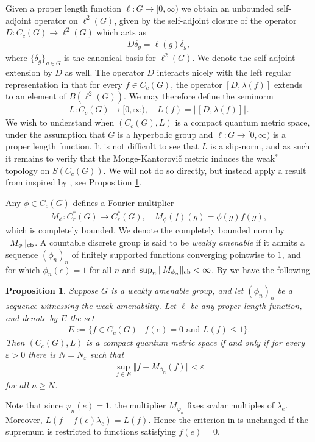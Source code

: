 \documentclass[12pt,a4paper,oneside,final,reqno]{amsart}
\theoremstyle{plain}
\newtheorem{proposition}[theorem]{Proposition}
\theoremstyle{definition}
\begin{document}
Given a proper length function $\ell \colon G \to [0,\infty)$ we obtain an unbounded self-adjoint operator on $\ell^2(G)$, given by the self-adjoint closure of the operator $D \colon C_c(G) \to \ell^2(G)$ which acts as
\begin{align*}
    D \delta_g = \ell(g) \delta_g,
\end{align*}
where $\{\delta_g\}_{g\in G}$ is the canonical basis for $\ell^2(G)$. We denote the self-adjoint extension by $D$ as well. The operator $D$ interacts nicely with the left regular representation in that for every $f \in C_c(G)$, the operator $[D, \lambda(f)]$ extends to an element of $B(\ell^2(G))$. We may therefore define the seminorm
\begin{align}\label{eq:def-L-ell}
    L \colon C_c (G) \to [0,\infty), \quad L(f) = \Vert [D, \lambda(f)]\Vert.
\end{align}
We wish to understand when $(C_c(G), L)$ is a compact quantum metric space, under the assumption that $G$ is a hyperbolic group and $\ell\colon G \to [0,\infty)$ is a proper length function. It is not difficult to see that $L$ is a slip-norm, and as such it remains to verify that the Monge-Kantorovi\v{c} metric induces the weak$^*$ topology on $S(C_c(G))$. We will not do so directly, but instead apply a result from \cite{AustadGpdCQMS} inspired by \cite[Proposition 1.3]{OzawaRieffel2005}, see Proposition \ref{prop:CQMS-equiv-weak-amenable-gps}. 


Any $\phi \in C_c(G)$ defines a Fourier multiplier 
\begin{align*}
    M_\phi \colon C^*_r(G) \to C^*_r(G), \quad M_\phi(f)(g) = \phi(g) f(g),
\end{align*}
which is completely bounded. We denote the completely bounded norm by $\Vert M_\phi \Vert_{\rm cb}$. A countable discrete group is said to be \emph{weakly amenable} if it admits a sequence $(\phi_n)_n$ of finitely supported functions converging pointwise to $1$, and for which $\phi_n(e) = 1$ for all $n$ and $\sup_{n}\Vert M_{\phi_n}\Vert_{\rm cb} < \infty$. 
By \cite[Corollary 3.16]{AustadGpdCQMS} we have the following
\begin{proposition}\label{prop:CQMS-equiv-weak-amenable-gps}
    Suppose $G$ is a weakly amenable group, and let $(\phi_n)_n$ be a sequence witnessing the weak amenability. Let $\ell$ be any proper length function, and denote by $E$ the set
    \begin{align*}
        E := \{f \in C_c(G) \mid f(e)=0 \text{ and } L(f) \leq 1 \}.
    \end{align*}
    Then $(C_c(G), L)$ is a compact quantum metric space if and only if for every $\varepsilon > 0$ there is $N = N_\varepsilon$ such that
    \begin{align*}
        \sup_{f \in E} \Vert f - M_{\phi_n}(f) \Vert < \varepsilon
    \end{align*}
    for all $n \geq N$. 
\end{proposition}
Note that since $\varphi_n(e)=1$, the multiplier $M_{\varphi_n}$ fixes scalar multiples of $\lambda_e$. Moreover, $L(f-f(e)\lambda_e)=L(f)$. Hence the criterion in \cite[Corollary 3.16]{AustadGpdCQMS} is unchanged if the supremum is restricted to functions satisfying $f(e)=0$.
\end{document}
